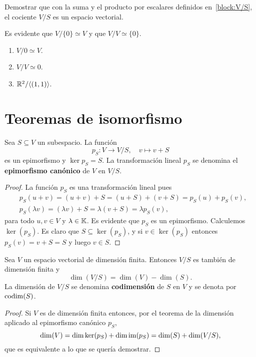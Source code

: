 \begin{xca}
    Demostrar que con la suma y el producto por escalares definidos
    en~\ref{block:V/S}, el cociente $V/S$ es un espacio vectorial. 
\end{xca}

\begin{examples}
	Es evidente que $V/\{0\}\simeq V$ y que $V/V\simeq\{0\}$. 
	\begin{enumerate}
		\item $V/0\simeq V$.
		\item $V/V\simeq 0$.
		\item $\mathbb{R}^2/\langle(1,1)\rangle$.
	\end{enumerate}
\end{examples}

\section{Teoremas de isomorfismo}

\begin{prop}
    Sea $S\subseteq V$ un subespacio. La función 
    \[
        p_S\colon V\to V/S,\quad v\mapsto v+S
    \]
    es un epimorfismo y $\ker p_S=S$. La
    transformación lineal $p_S$ se denomina el \textbf{epimorfismo canónico} de
    $V$ en $V/S$.

    \begin{proof}
        La función $p_S$ es una transformación lineal pues 
        \begin{align*}
            &p_S(u+v)=(u+v)+S=(u+S)+(v+S)=p_S(u)+p_S(v),\\
            &p_S(\lambda v)=(\lambda v)+S=\lambda(v+S)=\lambda p_S(v),
        \end{align*}
        para todo $u,v\in V$ y $\lambda\in\mathbb{K}$. Es evidente que $p_S$ es un
        epimorfismo. Calculemos $\ker(p_S)$. Es claro que
        $S\subseteq\ker(p_S)$, y si $v\in\ker(p_S)$ entonces $p_S(v)=v+S=S$ y
        luego $v\in S$. 
    \end{proof}
\end{prop}

\begin{cor}
    Sea $V$ un espacio vectorial de dimensión finita. Entonces $V/S$ es también
    de dimensión finita y 
    \[
    \dim(V/S)=\dim(V)-\dim(S).
    \]
    La dimensión de $V/S$ se denomina \textbf{codimensión} de $S$ en $V$ y se
    denota por $\operatorname{codim}(S)$.

    \begin{proof}
        Si $V$ es de dimensión finita entonces, por el teorema de la dimensión
        aplicado al epimorfismo canónico $p_S$, 
        \[
            \dim(V)=\dim\ker(p_S)+\dim\operatorname{im}(p_S)=\dim(S)+\dim(V/S), 
        \]
        que es equivalente a lo que se quería demostrar.
    \end{proof}
\end{cor}

